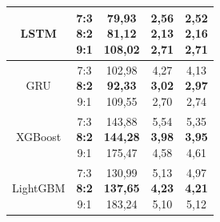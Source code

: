 \documentclass{ieeeojies}
\begin{document}
\begin{table}[H]
\begin{tabular*}{\linewidth}{@{\extracolsep{\fill}}|c|c|c|c|c|}
        \hline
        LSTM & \makecell{7:3 \\ \textbf{8:2} \\ 9:1} & \makecell{79,93 \\ \textbf{81,12} \\ 108,02} & \makecell{2,56 \\ \textbf{2,13} \\ 2,71} & \makecell{2,52 \\ \textbf{2,16} \\ 2,71} \\
        \hline
        GRU & \makecell{7:3 \\ \textbf{8:2} \\ 9:1} & \makecell{102,98 \\ \textbf{92,33} \\ 109,55} & \makecell{4,27 \\ \textbf{3,02} \\ 2,70} & \makecell{4,13 \\ \textbf{2,97} \\ 2,74} \\
        \hline
        XGBoost & \makecell{7:3 \\ \textbf{8:2} \\ 9:1} & \makecell{143,88 \\ \textbf{144,28} \\ 175,47} & \makecell{5,54 \\ \textbf{3,98} \\ 4,58} & \makecell{5,35 \\ \textbf{3,95} \\ 4,61} \\
        \hline
        LightGBM & \makecell{7:3 \\ \textbf{8:2} \\ 9:1} & \makecell{130,99 \\ \textbf{137,65} \\ 183,24} & \makecell{5,13 \\ \textbf{4,23} \\ 5,10} & \makecell{4,97 \\ \textbf{4,21} \\ 5,12} \\
        \hline
    \end{tabular*}


\end{table}
\end{document}
